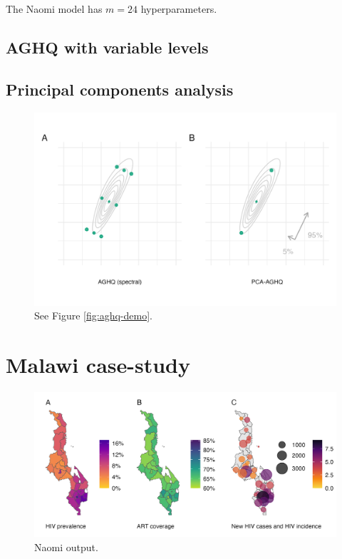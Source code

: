 \documentclass[a4paper, nobind]{templates/ociamthesis}
\begin{document}
The Naomi model has \(m = 24\) hyperparameters.

\hypertarget{aghq-with-variable-levels}{%
\subsection{AGHQ with variable levels}\label{aghq-with-variable-levels}}

\hypertarget{principal-components-analysis}{%
\subsection{Principal components analysis}\label{principal-components-analysis}}



\begin{figure}

{\centering \includegraphics[width=0.95\linewidth]{figures/naomi-aghq/pca-demo} 

}

\caption{See Figure \ref{fig:aghq-demo}.}\label{fig:pca-demo}
\end{figure}

\hypertarget{malawi-case-study}{%
\section{Malawi case-study}\label{malawi-case-study}}

\begin{figure}

{\centering \includegraphics[width=0.95\linewidth]{resources/naomi-aghq/20230811-095752-5b8181d8/depends/figB} 

}

\caption{Naomi output.}\label{fig:figB}
\end{figure}
\end{document}
